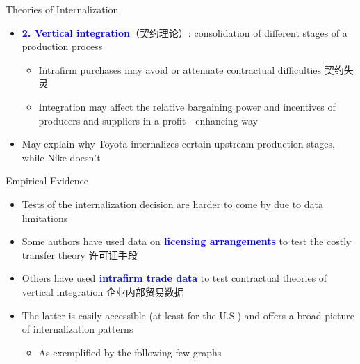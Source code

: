 \documentclass[10pt,hyperref={CJKbookmarks=true},xcolor=dvipsnames,aspectratio=169]{beamer}
\begin{document}
\begin{frame}{Theories of Internalization }

\begin{itemize}
\item \textbf{\textcolor{blue}{2. Vertical integration}}（契约理论）: consolidation
of different stages of a production process 

\begin{itemize}
\item Intrafirm purchases may avoid or attenuate contractual difficulties
契约失灵
\item Integration may affect the relative bargaining power and incentives
of producers and suppliers in a profit - enhancing way
\end{itemize}
\item May explain why Toyota internalizes certain upstream production stages,
while Nike doesn’t
\end{itemize}
\end{frame}

\begin{frame}{Empirical Evidence }

\begin{itemize}
\item Tests of the internalization decision are harder to come by due to
data limitations 
\item Some authors have used data on\textbf{\textcolor{blue}{{} licensing
arrangements}} to test the costly transfer theory 许可证手段
\item Others have used\textbf{\textcolor{blue}{{} intrafirm trade data}} to
test contractual theories of vertical integration 企业内部贸易数据
\item The latter is easily accessible (at least for the U.S.) and offers
a broad picture of internalization patterns

\begin{itemize}
\item As exemplified by the following few graphs
\end{itemize}
\end{itemize}
\end{frame}
\end{document}
